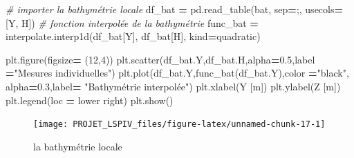 \documentclass[
]{article}
\newenvironment{Shaded}{\begin{snugshade}}{\end{snugshade}}
\newcommand{\CommentTok}[1]{\textcolor[rgb]{0.56,0.35,0.01}{\textit{#1}}}
\newcommand{\DecValTok}[1]{\textcolor[rgb]{0.00,0.00,0.81}{#1}}
\newcommand{\FloatTok}[1]{\textcolor[rgb]{0.00,0.00,0.81}{#1}}
\newcommand{\NormalTok}[1]{#1}
\newcommand{\OperatorTok}[1]{\textcolor[rgb]{0.81,0.36,0.00}{\textbf{#1}}}
\newcommand{\StringTok}[1]{\textcolor[rgb]{0.31,0.60,0.02}{#1}}
\begin{document}
\begin{Shaded}
\begin{Highlighting}[]

\CommentTok{\# importer la bathymétrie locale}
\NormalTok{df\_bat }\OperatorTok{=}\NormalTok{ pd.read\_table(bat, sep}\OperatorTok{=}\StringTok{\textquotesingle{};\textquotesingle{}}\NormalTok{, usecols}\OperatorTok{=}\NormalTok{[}\StringTok{\textquotesingle{}Y\textquotesingle{}}\NormalTok{, }\StringTok{\textquotesingle{}H\textquotesingle{}}\NormalTok{])}
\CommentTok{\# fonction interpolée de la bathymétrie}
\NormalTok{func\_bat }\OperatorTok{=}\NormalTok{ interpolate.interp1d(df\_bat[}\StringTok{\textquotesingle{}Y\textquotesingle{}}\NormalTok{], df\_bat[}\StringTok{\textquotesingle{}H\textquotesingle{}}\NormalTok{], kind}\OperatorTok{=}\StringTok{\textquotesingle{}quadratic\textquotesingle{}}\NormalTok{)}


\NormalTok{plt.figure(figsize}\OperatorTok{=}\NormalTok{ (}\DecValTok{12}\NormalTok{,}\DecValTok{4}\NormalTok{))}
\NormalTok{plt.scatter(df\_bat.Y,df\_bat.H,alpha}\OperatorTok{=}\FloatTok{0.5}\NormalTok{,label }\OperatorTok{=}\StringTok{"Mesures individuelles"}\NormalTok{)}
\NormalTok{plt.plot(df\_bat.Y,func\_bat(df\_bat.Y),color }\OperatorTok{=}\StringTok{"black"}\NormalTok{, alpha}\OperatorTok{=}\FloatTok{0.3}\NormalTok{,label}\OperatorTok{=} \StringTok{"Bathymétrie interpolée"}\NormalTok{)}
\NormalTok{plt.xlabel(}\StringTok{\textquotesingle{}Y [m]\textquotesingle{}}\NormalTok{)}
\NormalTok{plt.ylabel(}\StringTok{\textquotesingle{}Z [m]\textquotesingle{}}\NormalTok{)}
\NormalTok{plt.legend(loc }\OperatorTok{=} \StringTok{\textquotesingle{}lower right\textquotesingle{}}\NormalTok{)}
\NormalTok{plt.show()}
\end{Highlighting}
\end{Shaded}

\begin{figure}[H]
\texttt{[image: PROJET\_LSPIV\_files/figure-latex/unnamed-chunk-17-1]} \caption{la bathymétrie locale}\label{fig:unnamed-chunk-17}
\end{figure}
\end{document}
